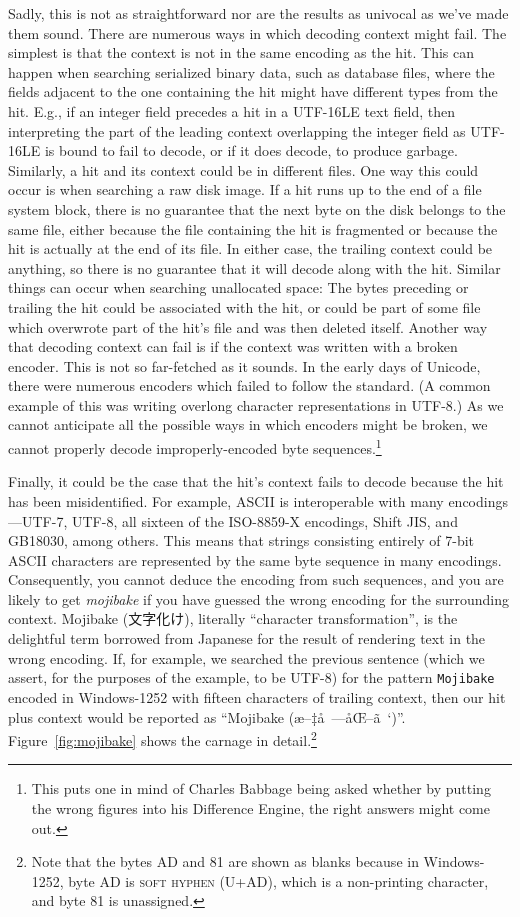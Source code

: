 \documentclass[5p,final,number,sort&compress]{elsarticle}
\newcommand{\re}[1]{\texttt{#1}}
\begin{document}
Sadly, this is not as straightforward nor are the results as univocal as we've made them sound. There are numerous ways in which decoding context might fail. The simplest is that the context is not in the same encoding as the hit. This can happen when searching serialized binary data, such as database files, where the fields adjacent to the one containing the hit might have different types from the hit. E.g., if an integer field precedes a hit in a UTF-16LE text field, then interpreting the part of the leading context overlapping the integer field as UTF-16LE is bound to fail to decode, or if it does decode, to produce garbage. Similarly, a hit and its context could be in different files. One way this could occur is when searching a raw disk image. If a hit runs up to the end of a file system block, there is no guarantee that the next byte on the disk belongs to the same file, either because the file containing the hit is fragmented or because the hit is actually at the end of its file. In either case, the trailing context could be anything, so there is no guarantee that it will decode along with the hit. Similar things can occur when searching unallocated space: The bytes preceding or trailing the hit could be associated with the hit, or could be part of some file which overwrote part of the hit's file and was then deleted itself. Another way that decoding context can fail is if the context was written with a broken encoder. This is not so far-fetched as it sounds. In the early days of Unicode, there were numerous encoders which failed to follow the standard. (A common example of this was writing overlong character representations in UTF-8.) As we cannot anticipate all the possible ways in which encoders might be broken, we cannot properly decode improperly-encoded byte sequences.\footnote{This puts one in mind of Charles Babbage being asked whether by putting the wrong figures into his Difference Engine, the right answers might come out.}

Finally, it could be the case that the hit's context fails to decode because the hit has been misidentified. For example, ASCII is interoperable with many encodings---UTF-7, UTF-8, all sixteen of the ISO-8859-X encodings, Shift JIS, and GB18030, among others. This means that strings consisting entirely of 7-bit ASCII characters are represented by the same byte sequence in many encodings. Consequently, you cannot deduce the encoding from such sequences, and you are likely to get \emph{mojibake} if you have guessed the wrong encoding for the surrounding context. Mojibake ({\cjk 文字化け}), literally ``character transformation'', is the delightful term borrowed from Japanese for the result of rendering text in the wrong encoding. If, for example, we searched the previous sentence (which we assert, for the purposes of the example, to be UTF-8) for the pattern \re{Mojibake} encoded in Windows-1252 with fifteen characters of trailing context, then our hit plus context would be reported as ``Mojibake (æ–‡å\ —åŒ–ã\ ‘)''. Figure~\ref{fig:mojibake} shows the carnage in detail.\footnote{Note that the bytes AD and 81 are shown as blanks because in Windows-1252, byte AD is \textsc{soft hyphen} (U+AD), which is a non-printing character, and byte 81 is unassigned.}
\end{document}
